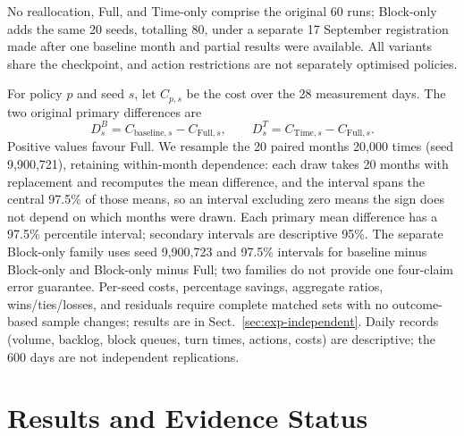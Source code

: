 \documentclass[a4paper]{llncs}
\begin{document}
No reallocation, Full, and Time-only comprise the original 60 runs;
Block-only adds the same 20 seeds, totalling 80, under a separate
17 September registration made after one baseline month and partial
results were available. All variants share the checkpoint, and action
restrictions are not separately optimised policies.

For policy $p$ and seed $s$, let $C_{p,s}$ be the cost over the
28 measurement days. The two original primary differences are
\begin{equation}
D_s^{B}=C_{\mathrm{baseline},s}-C_{\mathrm{Full},s},\qquad
D_s^{T}=C_{\mathrm{Time},s}-C_{\mathrm{Full},s}.
\end{equation}
Positive values favour Full. We resample the 20 paired months
20{,}000 times (seed 9{,}900{,}721), retaining within-month dependence:
each draw takes 20 months with replacement and recomputes the mean
difference, and the interval spans the central 97.5\% of those means, so
an interval excluding zero means the sign does not depend on which
months were drawn. Each primary mean difference has a 97.5\% percentile
interval; secondary intervals are descriptive 95\%. The separate
Block-only family uses seed 9{,}900{,}723 and 97.5\% intervals for
baseline minus Block-only and Block-only minus Full; two families do not
provide one four-claim error guarantee. Per-seed costs, percentage savings,
aggregate ratios, wins/ties/losses, and residuals require complete
matched sets with no outcome-based sample changes; results are in
Sect.~\ref{sec:exp-independent}. Daily records (volume, backlog, block
queues, turn times, actions, costs) are descriptive; the 600 days are not
independent replications.

\section{Results and Evidence Status}
\label{sec:exp}
\end{document}
